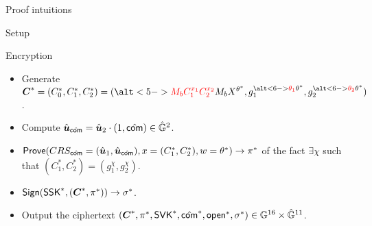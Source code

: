 \begin{frame}{Proof intuitions}
\begin{block}{Setup}
{\begin{itemize}
              \end{itemize}
            }
  \end{block}
      Encryption
    \begin{itemize}
    \item Generate $\vec{C}^* = (C_0^*, C_1^*, C_2^*) = (\alt<5->{{\color{red}M_bC_1^{x_1}C_2^{x_2}}}{ M_bX^{\theta^*}}, g_1^{\alt<6->{{\color{red}\theta_1}}{\theta^*}},  g_2^{\alt<6->{{\color{red}\theta_2}}{\theta^*}})$.
    \item Compute $\hat{\boldsymbol{u}}_{\hat{\mathsf{com}}} = \hat{\boldsymbol{u}}_2 \cdot (1, \hat{\mathsf{com}}) \in \hat{\mathbb{G}}^2$.	
    \item ${\mathsf{Prove}}(CRS_{\hat{\mathsf{com}}}= (\hat{\boldsymbol{u}}_1, \hat{\boldsymbol{u}}_{\hat{\mathsf{com}}}), x = (C_1^*, C_2^*), w = \theta^*) \to \pi^*$ of the fact $\exists \chi$ such that $(C_1^*, C_2^*) = (g_1^\chi, g_2^\chi)$.
    \item ${\mathsf{Sign}}(\mathsf{SSK}^*,(\boldsymbol{C}^*,\pi^*)) \to \sigma^*$.
    \item Output the ciphertext $(\boldsymbol{C}^*, \pi^*, \mathsf{SVK}^*, \hat{\mathsf{com}}^*, \mathsf{open}^*, \sigma^*) \in \mathbb{G}^{16} \times \hat{\mathbb{G}}^{11}$.
    \end{itemize}

\end{frame}
